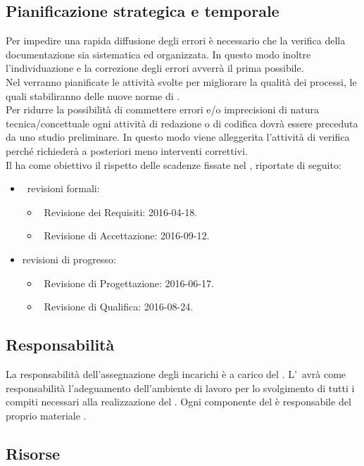 	\subsection{Pianificazione strategica e temporale}
	\label{sec:3.4}
		Per impedire una rapida diffusione degli errori è necessario che la verifica della documentazione sia sistematica ed organizzata. In questo modo inoltre l'individuazione e la correzione degli errori avverrà il prima possibile. \\
		Nel \PPdoc verranno pianificate le attività svolte per migliorare la qualità dei processi, le quali stabiliranno delle nuove norme di . \\
		Per ridurre la possibilità di commettere errori e/o imprecisioni di natura tecnica/concettuale ogni attività di redazione o di codifica dovrà essere preceduta da uno studio preliminare. In questo modo viene alleggerita l'attività di verifica perché richiederà a posteriori meno interventi correttivi. \\
		Il  ha come obiettivo il rispetto delle scadenze fissate nel \PPdoc, riportate di seguito:
		\begin{itemize}
			\item\ revisioni formali:
			\begin{itemize}
				\item\ Revisione dei Requisiti: 2016-04-18.
				\item\ Revisione di Accettazione: 2016-09-12.
			\end{itemize}
			\item revisioni di progresso:
			\begin{itemize}
				\item\ Revisione di Progettazione: 2016-06-17.
				\item\ Revisione di Qualifica: 2016-08-24.
			\end{itemize}
		\end{itemize}
	\subsection{Responsabilità}
	\label{sec:3.5}
		La responsabilità dell'assegnazione degli incarichi è a carico del \RES. L'\AM\ avrà come responsabilità l'adeguamento dell'ambiente di lavoro per lo svolgimento di tutti i compiti necessari alla realizzazione del . Ogni componente del  è responsabile del proprio materiale .
	\subsection{Risorse}
	\label{sec:3.6}
